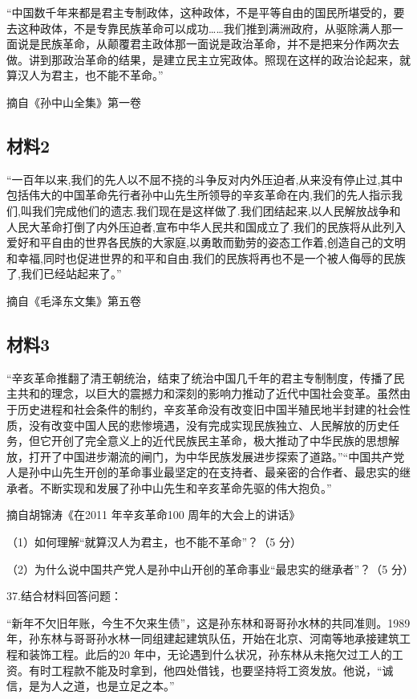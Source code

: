 \documentclass[UTF8,11pt]{ctexart}
\begin{document}
“中国数千年来都是君主专制政体，这种政体，不是平等自由的国民所堪受的，要去这种政体，不是专靠民族革命可以成功……我们推到满洲政府，从驱除满人那一面说是民族革命，从颠覆君主政体那一面说是政治革命，并不是把来分作两次去做。讲到那政治革命的结果，是建立民主立宪政体。照现在这样的政治论起来，就算汉人为君主，也不能不革命。”

摘自《孙中山全集》第一卷


\subsection*{材料2}

“一百年以来,我们的先人以不屈不挠的斗争反对内外压迫者,从来没有停止过,其中包括伟大的中国革命先行者孙中山先生所领导的辛亥革命在内,我们的先人指示我们,叫我们完成他们的遗志.我们现在是这样做了.我们团结起来,以人民解放战争和人民大革命打倒了内外压迫者,宣布中华人民共和国成立了.我们的民族将从此列入爱好和平自由的世界各民族的大家庭,以勇敢而勤劳的姿态工作着,创造自己的文明和幸福,同时也促进世界的和平和自由.我们的民族将再也不是一个被人侮辱的民族了,我们已经站起来了。”

摘自《毛泽东文集》第五卷

\subsection*{材料3}

“辛亥革命推翻了清王朝统治，结束了统治中国几千年的君主专制制度，传播了民主共和的理念，以巨大的震撼力和深刻的影响力推动了近代中国社会变革。虽然由于历史进程和社会条件的制约，辛亥革命没有改变旧中国半殖民地半封建的社会性质，没有改变中国人民的悲惨境遇，没有完成实现民族独立、人民解放的历史任务，但它开创了完全意义上的近代民族民主革命，极大推动了中华民族的思想解放，打开了中国进步潮流的闸门，为中华民族发展进步探索了道路。”“中国共产党人是孙中山先生开创的革命事业最坚定的在支持者、最亲密的合作者、最忠实的继承者。不断实现和发展了孙中山先生和辛亥革命先驱的伟大抱负。”

摘自胡锦涛《在2011 年辛亥革命100 周年的大会上的讲话》

（1）如何理解“就算汉人为君主，也不能不革命”？（5 分）


（2）为什么说中国共产党人是孙中山开创的革命事业“最忠实的继承者”？（5 分）


37.结合材料回答问题：

“新年不欠旧年账，今生不欠来生债”，这是孙东林和哥哥孙水林的共同准则。1989 年，孙东林与哥哥孙水林一同组建起建筑队伍，开始在北京、河南等地承接建筑工程和装饰工程。此后的20 年中，无论遇到什么状况，孙东林从未拖欠过工人的工资。有时工程款不能及时拿到，他四处借钱，也要坚持将工资发放。他说，“诚信，是为人之道，也是立足之本。”
\end{document}
